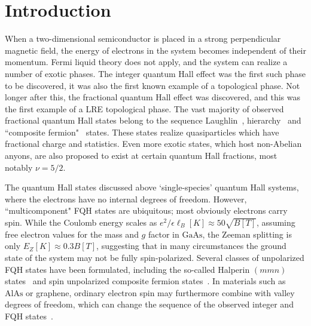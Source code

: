 \section{Introduction}

When a two-dimensional semiconductor is placed in a strong perpendicular magnetic field, the energy of electrons in the system becomes independent of their momentum. Fermi liquid theory does not apply, and the system can realize a number of exotic phases. The integer quantum Hall effect was the first such phase to be discovered, it was also the first known example of a topological phase\cite{vonKlitzing}. Not longer after this, the fractional quantum Hall effect was discovered\cite{Tsui-PhysRevLett.48.1559}, and this was the first example of a LRE topological phase. The vast majority of observed fractional quantum Hall states belong to the sequence Laughlin~\cite{Laughlin-PhysRevLett.50.1395}, hierarchy~\cite{Haldane1983, Halperin84} and ``composite fermion"~\cite{Jain:1989p294} states. These states realize quasiparticles which have fractional charge and statistics\cite{Laughlin-PhysRevLett.50.1395,LeinaasMyrheim, Arovas-Schrieffer-Wilczek}. 
Even more exotic states, which host non-Abelian anyons, are also proposed to exist at certain quantum Hall fractions, most notably $\nu=5/2$\cite{MooreRead, Greiter91, Greiter92}. 

The quantum Hall states discussed above `single-species' quantum Hall systems, where the electrons have no internal degrees of freedom. 
However, ``multicomponent" FQH states are ubiquitous; most obviously electrons carry spin.
While the Coulomb energy scales as $e^2/\epsilon\ell_B [\unit{K}] \approx 50 \sqrt{B[\unit{T}]}$, assuming free electron values for the mass and $g$ factor in $\mathrm{GaAs}$, the Zeeman splitting is only $E_Z [\unit{K}] \approx 0.3 B[\unit{T}]$, suggesting that in many circumstances the ground state of the system may not be fully spin-polarized. 
Several classes of unpolarized FQH states have been formulated, including the so-called Halperin $(mmn)$ states~\cite{Halperin83} and spin unpolarized composite fermion states~\cite{Wu93, Wu94, Davenport12, Balram14}.
In materials such as $\mathrm{AlAs}$ or graphene, ordinary electron spin may furthermore combine with valley degrees of freedom, which can change the sequence of the observed integer and FQH states~\cite{Bishop07, Padmanabhan09, Gokmen10, Novoselov05, Zhang05, Du09, Bolotin09, Ghahari11, Dean11, Feldman12}. 

